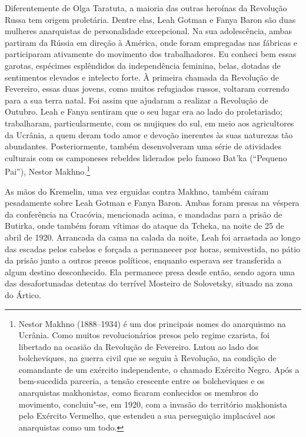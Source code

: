 Diferentemente de Olga Taratuta, a maioria das outras heroínas da
Revolução Russa tem origem proletária. Dentre elas, Leah Gotman e Fanya
Baron são duas mulheres anarquistas de personalidade excepcional. Na sua
adolescência, ambas partiram da Rússia em direção à América, onde foram
empregadas nas fábricas e participaram ativamente do movimento dos
trabalhadores. Eu conheci bem essas garotas, espécimes esplêndidos da
independência feminina, belas, dotadas de sentimentos elevados e
intelecto forte. À primeira chamada da Revolução de Fevereiro, essas
duas jovens, como muitos refugiados russos, voltaram correndo para a sua terra
natal. Foi assim que ajudaram a realizar a Revolução de Outubro. Leah e
Fanya sentiram que o seu lugar era ao lado do proletariado; trabalharam,
particularmente, com os mujiques do sul, em meio aos agricultores da
Ucrânia, a quem deram todo amor e devoção inerentes às suas naturezas
tão abundantes. Posteriormente, também desenvolveram uma série de
atividades culturais com os camponeses rebeldes liderados pelo famoso
Bat'ka (``Pequeno Pai''), Nestor Makhno.\footnote{Nestor Makhno
  (1888--1934) é um dos principais nomes do anarquismo na Ucrânia. Como
  muitos revolucionários presos pelo regime czarista, foi libertado na
  ocasião da Revolução de Fevereiro. Lutou ao lado dos bolcheviques, na guerra civil que se seguiu à Revolução, na condição de comandante de um exército independente, o chamado Exército Negro. Após a bem-sucedida parceria, a tensão crescente entre os bolcheviques e os anarquistas makhonistas, como
  ficaram conhecidos os membros do movimento,
  concluiu"-se, em 1920, com a invasão do território makhonista pelo
  Exército Vermelho, que estendeu a sua perseguição implacável aos
  anarquistas como um todo.}

As mãos do Kremelin, uma vez erguidas contra Makhno, também caíram
pesadamente sobre Leah Gotman e Fanya Baron. Ambas foram presas na
véspera da conferência na Cracóvia, mencionada acima, e mandadas para a
prisão de Butirka, onde também foram vítimas do ataque da Tcheka, na
noite de 25 de abril de 1920. Arrancada da cama na calada da noite, Leah
foi arrastada ao longo das escadas pelos cabelos e forçada a permanecer por
horas, semivestida, no pátio da prisão junto a outros presos políticos,
enquanto esperava ser transferida a algum destino desconhecido. Ela
permanece presa desde então, sendo agora uma das desafortunadas detentas
do terrível Mosteiro de Solovetsky, situado na zona do Ártico.

